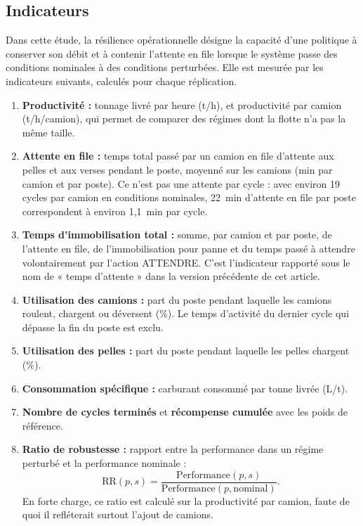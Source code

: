 \documentclass[11pt,a4paper]{article}
\newif\ifrevmarks
\newcommand{\revtag}[1]{\ifrevmarks\textsuperscript{\textcolor{red!70!black}{\scriptsize[#1]}}\fi}
\newenvironment{revbloc}[1]{\par\ifrevmarks\color{revcolor}\noindent\revtag{#1}\ \fi}{\par}
\newcommand{\aexp}[1]{\ifrevmarks\textcolor{orange!85!black}{\textbf{[EXPÉRIENCE À FAIRE : #1]}}\fi}
\begin{document}
\aexp{évaluer sur des graines disjointes de celles de l'entraînement, par exemple 10\,000 à 10\,029 : les graines 42 à 71 correspondent aux premiers épisodes d'entraînement (rapport d'audit, M7).}

\subsection{Indicateurs}
\label{sec:metrics}

\begin{revbloc}{M2, M21, M15, m18}
Dans cette étude, la résilience opérationnelle désigne la capacité d'une politique à conserver son débit et à contenir l'attente en file lorsque le système passe des conditions nominales à des conditions perturbées. Elle est mesurée par les indicateurs suivants, calculés pour chaque réplication.

\begin{enumerate}
  \item \textbf{Productivité :} tonnage livré par heure (t/h), et productivité par camion (t/h/camion), qui permet de comparer des régimes dont la flotte n'a pas la même taille.
  \item \textbf{Attente en file :} temps total passé par un camion en file d'attente aux pelles et aux verses pendant le poste, moyenné sur les camions (min par camion et par poste). Ce n'est pas une attente par cycle : avec environ 19 cycles par camion en conditions nominales, 22~min d'attente en file par poste correspondent à environ 1,1~min par cycle.
  \item \textbf{Temps d'immobilisation total :} somme, par camion et par poste, de l'attente en file, de l'immobilisation pour panne et du temps passé à attendre volontairement par l'action ATTENDRE. C'est l'indicateur rapporté sous le nom de « temps d'attente » dans la version précédente de cet article.
  \item \textbf{Utilisation des camions :} part du poste pendant laquelle les camions roulent, chargent ou déversent (\%). Le temps d'activité du dernier cycle qui dépasse la fin du poste est exclu.
  \item \textbf{Utilisation des pelles :} part du poste pendant laquelle les pelles chargent (\%).
  \item \textbf{Consommation spécifique :} carburant consommé par tonne livrée (L/t).
  \item \textbf{Nombre de cycles terminés} et \textbf{récompense cumulée} avec les poids de référence.
  \item \textbf{Ratio de robustesse :} rapport entre la performance dans un régime perturbé et la performance nominale :
  \begin{equation}
  \mathrm{RR}(p,s) = \frac{\mathrm{Performance}(p,s)}{\mathrm{Performance}(p,\mathrm{nominal})} .
  \label{eq:rr}
  \end{equation}
  En forte charge, ce ratio est calculé sur la productivité par camion, faute de quoi il refléterait surtout l'ajout de camions.
\end{enumerate}
\end{revbloc}
\end{document}
